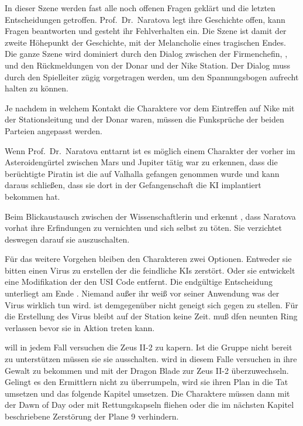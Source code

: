 \vfill
\newpage

\begin{remarks}
	In dieser Szene werden fast alle noch offenen Fragen geklärt und die letzten Entscheidungen getroffen. Prof.~Dr.~Naratova legt ihre Geschichte offen, kann Fragen beantworten und gesteht ihr Fehlverhalten ein. Die Szene ist damit der zweite Höhepunkt der Geschichte, mit der Melancholie eines tragischen Endes. Die ganze Szene wird dominiert durch den Dialog zwischen der Firmenchefin, \xl{}, \ml{} und den Rückmeldungen von der Donar und der Nike Station. Der Dialog muss durch den Spielleiter zügig vorgetragen werden, um den Spannungsbogen aufrecht halten zu können.

	Je nachdem in welchem Kontakt die Charaktere vor dem Eintreffen auf Nike mit der Stationsleitung und der Donar waren, müssen die Funksprüche der beiden Parteien angepasst werden.

	Wenn Prof.~Dr.~Naratova \xl{} enttarnt ist es möglich einem Charakter der vorher im Asteroidengürtel zwischen Mars und Jupiter tätig war zu erkennen, dass \xl{} die berüchtigte Piratin ist die auf Valhalla gefangen genommen wurde und kann daraus schließen, dass sie dort in der Gefangenschaft die KI implantiert bekommen hat.

	Beim Blickaustausch zwischen der Wissenschaftlerin und \xl{} erkennt \xl{}, dass Naratova vorhat ihre Erfindungen zu vernichten und sich selbst zu töten. Sie verzichtet deswegen darauf sie auszuschalten.

	Für das weitere Vorgehen bleiben den Charakteren zwei Optionen. Entweder sie bitten \ml{} einen Virus zu erstellen der die feindliche KIs zerstört. Oder sie entwickelt eine Modifikation der den USI Code entfernt. Die endgültige Entscheidung unterliegt am Ende \ml{}. Niemand außer ihr weiß vor seiner Anwendung was der Virus wirklich tun wird. \ml{} ist  demgegenüber nicht geneigt sich gegen \xl{} zu stellen. Für die Erstellung des Virus bleibt auf der Station keine Zeit. \ml{} muß dfen neunten Ring verlassen bevor sie in Aktion treten kann.
	
	\xl{} will in jedem Fall versuchen die Zeus II-2 zu kapern. Ist die Gruppe nicht bereit \xl{} zu unterstützen müssen sie sie ausschalten. \xl{} wird in diesem Falle versuchen \ml{} in ihre Gewalt zu bekommen und mit der Dragon Blade zur Zeus II-2 überzuwechseln. Gelingt es den Ermittlern nicht \xl{} zu überrumpeln, wird sie ihren Plan in die Tat umsetzen und das folgende Kapitel umsetzen. Die Charaktere müssen dann mit der Dawn of Day oder mit Rettungskapseln fliehen oder die im nächsten Kapitel beschriebene Zerstörung der Plane 9 verhindern.
\end{remarks}
